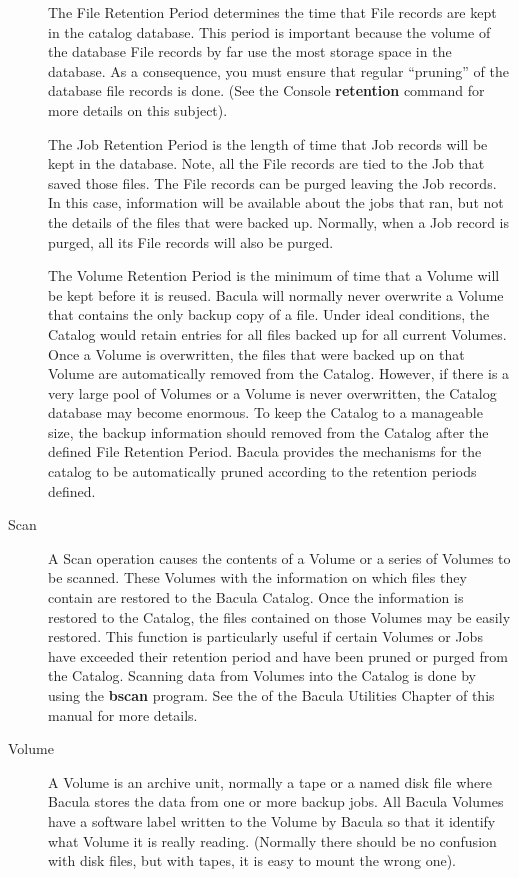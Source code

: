 \begin{description}
The File Retention Period  determines the time that File records are kept in
the catalog  database. This period is important because the volume of the 
database File records by far use the most storage space in the  database. As a
consequence, you must ensure that regular  ``pruning'' of the database file
records is done. (See  the Console {\bf retention} command for more details on
this  subject). 

The Job Retention Period is the length of time that  Job records will be kept
in the database. Note, all the File  records are tied to the Job that saved
those files. The File  records can be purged leaving the Job records. In this
case,  information will be available about the jobs that ran, but not the 
details of the files that were backed up. Normally, when a Job  record is
purged, all its File records will also be purged. 

The  Volume Retention Period is the minimum of time that a Volume will be 
kept before it is reused. Bacula will normally never  overwrite a Volume that
contains the only backup copy of a file.  Under ideal conditions, the Catalog
would retain entries for all  files backed up for all current Volumes. Once a
Volume is  overwritten, the files that were backed up on that Volume are 
automatically removed from the Catalog. However, if there is a very  large
pool of Volumes or a Volume is never overwritten, the Catalog  database may
become enormous. To keep the Catalog to a manageable  size, the backup
information should removed from the Catalog after  the defined File Retention
Period. Bacula provides the  mechanisms for the catalog to be automatically
pruned according to  the retention periods defined. 

\item [Scan]
   A Scan operation causes the contents of a Volume or a  series of Volumes to be
scanned. These Volumes with the information  on which files they contain are
restored to the Bacula Catalog.  Once the information is restored to the
Catalog, the files contained  on those Volumes may be easily restored. This
function is  particularly useful if certain Volumes or Jobs have exceeded 
their retention period and have been pruned or purged from the  Catalog.
Scanning data from Volumes into the Catalog is done  by using the {\bf bscan}
program. See the 
 of the Bacula Utilities Chapter of
this manual  for more details. 

\item [Volume]
   A Volume is an archive unit, normally a tape or  a named disk file where
Bacula stores the data from one or more  backup jobs. All Bacula Volumes have
a software label written to  the Volume by Bacula so that it identify what
Volume it is really  reading. (Normally there should be no confusion with disk
files,  but with tapes, it is easy to mount the wrong one). 
\end{description}

